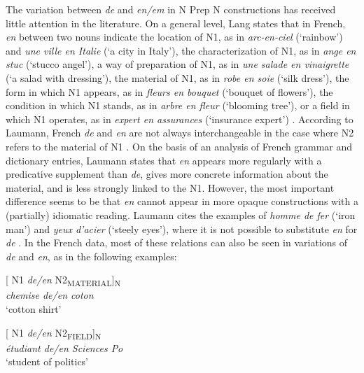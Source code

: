 \documentclass[output=paper]{langsci/langscibook}
\begin{document}
The variation between \textit{de} and \textit{en/em} in N Prep N constructions has received little attention in the literature. On a general level, Lang states that in French, \textit{en} between two nouns indicate the location of N1, as in \textit{arc-en-ciel} (`rainbow') and \textit{une ville en Italie} (`a city in Italy'), the characterization of N1, as in \textit{ange en stuc} (`stucco angel'), a way of preparation of N1, as in \textit{une salade en vinaigrette} (`a salad with dressing'), the material of N1, as in \textit{robe en soie} (`silk dress'), the form in which N1 appears, as in \textit{fleurs en bouquet} (`bouquet of flowers'), the condition in which N1 stands, as in \textit{arbre en fleur} (`blooming tree'), or a field in which N1 operates, as in \textit{expert en assurances} (`insurance expert') \citep[411]{Lang:1991}. According to Laumann, French\textit{ de} and \textit{en} are not always interchangeable in the case where N2 refers to the material of N1 \citep[55]{Laumann:1998}. On the basis of an analysis of French grammar and dictionary entries, Laumann states that \textit{en} appears more regularly with a predicative supplement than \textit{de}, gives more concrete information about the material, and is less strongly linked to the N1. However, the most important difference seems to be that \textit{en} cannot appear in more opaque constructions with a (partially) idiomatic reading. Laumann cites the examples of \textit{homme de fer} (`iron man') and \textit{yeux d’acier} (`steely eyes'), where it is not possible to substitute \textit{en} for \textit{de} \citep[55]{Laumann:1998}. In the French data, most of these relations can also be seen in variations of \textit{de} and \textit{en}, as in the following examples:\\ 

\begin{minipage}{0.4\textwidth}    %
[ N1 \textit{de/en} N2\textsubscript{MATERIAL}]\textsubscript{N}\\
\textit{chemise de/en coton}\\
`cotton shirt'
\end{minipage}
\hfill            %
\begin{minipage}{0.4\textwidth}
[ N1 \textit{de/en} N2\textsubscript{FIELD}]\textsubscript{N}\\
\textit{étudiant de/en Sciences Po}\\
`student of politics'
\end{minipage} \\
\hfill  
\vspace{0.5cm}
\end{document}
